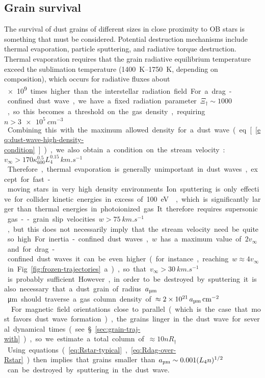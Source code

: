 \subsection{Grain survival}
\label{sec:grain-survival-dust}

The survival of dust grains of different sizes in close proximity to
OB stars is something that must be considered.  Potential destruction
mechanisms include thermal evaporation, particle sputtering, and
radiative torque destruction.  Thermal evaporation requires that the
grain radiative equilibrium temperature exceed the sublimation
temperature (\SIrange{1400}{1750}{K}, depending on composition), which
occurs for radiative fluxes about \SI{e9} times higher than the
interstellar radiation field.  For a drag-confined dust wave, we have
a fixed radiation parameter \(\Xi_\dag \sim 1000\), so this becomes a
threshold on the gas density, requiring \(n > \SI{3e5}{cm^{-3}}\).
Combining this with the maximum allowed density for a dust wave
(eq.~[\ref{eq:dust-wave-high-density-condition}]), we also obtain a
condition on the stream velocity:
\(v_\infty > 170 \kappa_{600}^{0.5} L_4^{0.15} \, \si{km.s^{-1}}\).  Therefore,
thermal evaporation is generally unimportant in dust waves, except for
fast-moving stars in very high density environments.

Ion sputtering is only effective for collider kinetic energies in
excess of \SI{100}{eV} \citep{Draine:1995a, Field:1997a}, which is
significantly larger than thermal energies in photoionized gas.  It
therefore requires supersonic gas--grain slip velocities
\(w > \SI{75}{km.s^{-1}}\), but this does not necessarily imply that
the stream velocity need be quite so high.  For inertia-confined dust
waves, \(w\) has a maximum value of \(2 v_\infty\) and for drag-confined
dust waves it can be even higher (for instance, reaching
\(w \approx 4 v_\infty\) in Fig.~\ref{fig:frozen-trajectories}a), so that
\(v_\infty > \SI{30}{km.s^{-1}}\) is probably sufficient.  However, in
order to be destroyed by sputtering it is also necessary that a dust
grain of radius \(\amu\)\,\si{\um} should traverse a gas column
density of \(\approx \num{2e21}\, \amu \,\si{cm^{-2}}\)
\citep{Draine:2011a}.  For magnetic field orientations close to
parallel (which is the case that most favors dust wave formation), the
grains linger in the dust wave for several dynamical times (see
\S~\ref{sec:grain-traj-with}), so we estimate a total column of
\(\approx 10 n R_\dag\).  Using equations~(\ref{eq:Rstar-typical},
\ref{eq:Rdag-over-Rstar}) then implies that grains smaller than
\(\amu \sim 0.001 (L_4 n)^{1/2}\) can be destroyed by sputtering in the
dust wave.

